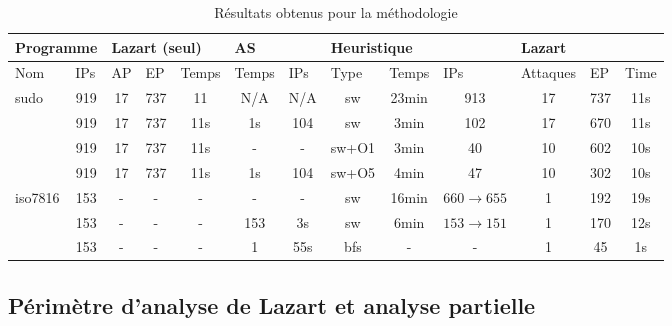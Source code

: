                 \begin{table}[!htpb]
                \scriptsize
                    \caption{Résultats obtenus pour la méthodologie}\label{tbl:results-fdep2}
                \begin{center}
                    \setlength\tabcolsep{4pt}
                    \begin{tabular}{l|c|c|c|c|c|c|c|c|c|c|c|c}
                    \multicolumn{2}{l|}{Programme} & \multicolumn{3}{l|}{Lazart (seul)} & \multicolumn{2}{l|}{AS} & \multicolumn{3}{l|}{Heuristique} & \multicolumn{3}{l}{Lazart} \\
                    \hline
                    \multicolumn{1}{l|}{Nom} & \multicolumn{1}{l|}{IPs}  & \multicolumn{1}{l|}{AP} & \multicolumn{1}{l|}{EP} & \multicolumn{1}{l|}{Temps} & \multicolumn{1}{l|}{Temps} & \multicolumn{1}{l|}{IPs} & \multicolumn{1}{l|}{Type} & \multicolumn{1}{l|}{Temps} & \multicolumn{1}{l|}{IPs} & \multicolumn{1}{l|}{Attaques} & \multicolumn{1}{l|}{EP} & \multicolumn{1}{l}{Time} \\
                    \hline
                    \hline
                    \multirow{4}{*}{sudo} & 919  & 17 & 737 & 11 & N/A & N/A & \gls{sw} & 23min & 913 & 17 & 737 & 11s \\
                     & 919  & 17 & 737 & 11s & 1s & 104 & \gls{sw} & 3min & 102 & 17 & 670 & 11s \\
                     & 919  & 17 & 737 & 11s & - & - & \gls{sw}+O1 & 3min & 40 & 10 & 602 & 10s \\
                     & 919  & 17 & 737 & 11s & 1s & 104 & \gls{sw}+O5 & 4min & 47 & 10 & 302 & 10s \\
                    \hline
                    \multirow{3}{*}{iso7816} & 153  & - & - & - & -& - & \gls{sw} & 16min & $660 \to 655$  & 1 & 192 & 19s \\
                     & 153  & - & - & - & 153 & 3s & \gls{sw} & 6min  & $153 \to 151$  & 1  & 170 & 12s \\
                     & 153  & - & - & - & 1 & 55s & \gls{bfs} & - & - & 1 & 45 &  1s\\
                    \end{tabular}
                \end{center}
            \end{table} 
        
        \subsection{Périmètre d'analyse de Lazart et analyse partielle}
        \label{sec:rsa-strat}
        
